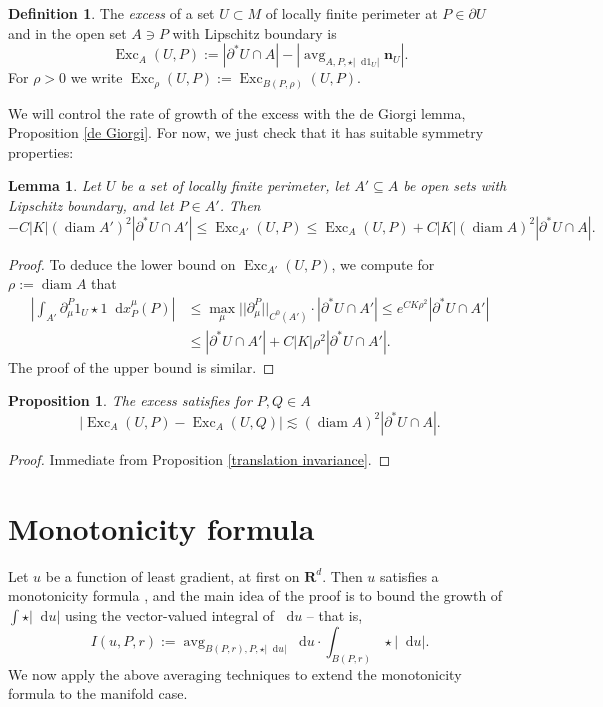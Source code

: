 \documentclass[reqno,11pt]{amsart}
\newcommand{\RR}{\mathbf{R}}
\DeclareMathOperator{\avg}{avg}
\DeclareMathOperator{\diam}{diam}
\DeclareMathOperator{\Exc}{Exc}
\newcommand*\dif{\mathop{}\!\mathrm{d}}
\newcommand{\normal}{\mathbf n}
\newcommand{\dfn}[1]{\emph{#1}\index{#1}}
\newtheorem{lemma}[theorem]{Lemma}
\newtheorem{proposition}[theorem]{Proposition}
\theoremstyle{definition}
\newtheorem{definition}[theorem]{Definition}
\numberwithin{equation}{section}
\begin{document}
\begin{definition}
The \dfn{excess} of a set $U \subset M$ of locally finite perimeter at $P \in \partial U$ and in the open set $A \ni P$ with Lipschitz boundary is
$$\Exc_A(U, P) := |\partial^* U \cap A| - \left|\avg_{A, P, \star |\dif 1_U|} \normal_U\right|.$$
For $\rho > 0$ we write $\Exc_\rho(U, P) := \Exc_{B(P, \rho)}(U, P)$.
\end{definition}

We will control the rate of growth of the excess with the de Giorgi lemma, Proposition \ref{de Giorgi}.
For now, we just check that it has suitable symmetry properties:

\begin{lemma}
Let $U$ be a set of locally finite perimeter, let $A' \subseteq A$ be open sets with Lipschitz boundary, and let $P \in A'$. Then
\begin{equation}\label{approximate monotone}
-C |K| (\diam A')^2 |\partial^* U \cap A'| \leq \Exc_{A'}(U, P) \leq \Exc_A(U, P) + C |K|(\diam A)^2 |\partial^* U \cap A|.
\end{equation}
\end{lemma}
\begin{proof}
To deduce the lower bound on $\Exc_{A'}(U, P)$, we compute for $\rho := \diam A$ that
\begin{align*}
    \left|\int_{A'} \partial^P_\mu 1_U \star 1 \dif x_P^\mu(P)\right|
 & \leq \max_\mu ||\partial^P_\mu||_{C^0(A')} \cdot |\partial^* U \cap A'| \leq e^{CK\rho^2} |\partial^* U \cap A'| \\
 & \leq |\partial^* U \cap A'| + C|K|\rho^2 |\partial^* U \cap A'|.
\end{align*}
The proof of the upper bound is similar.
\end{proof}

\begin{proposition}\label{translation invariance excess}
The excess satisfies for $P, Q \in A$
$$|\Exc_A(U, P) - \Exc_A(U, Q)| \lesssim (\diam A)^2 |\partial^* U \cap A|.$$
\end{proposition}
\begin{proof}
Immediate from Proposition \ref{translation invariance}.
\end{proof}


\section{Monotonicity formula}\label{MollifierSection}
Let $u$ be a function of least gradient, at first on $\RR^d$.
Then $u$ satisfies a monotonicity formula \cite[Theorem 5.12]{Giusti77}, and the main idea of the proof is to bound the growth of $\int \star |\dif u|$ using the vector-valued integral of $\dif u$ -- that is,
\begin{equation}\label{integral of du}
I(u, P, r) := \avg_{B(P, r), P, \star |\dif u|} \dif u \cdot \int_{B(P, r)} \star |\dif u|.
\end{equation}
We now apply the above averaging techniques to extend the monotonicity formula to the manifold case.
\end{document}
